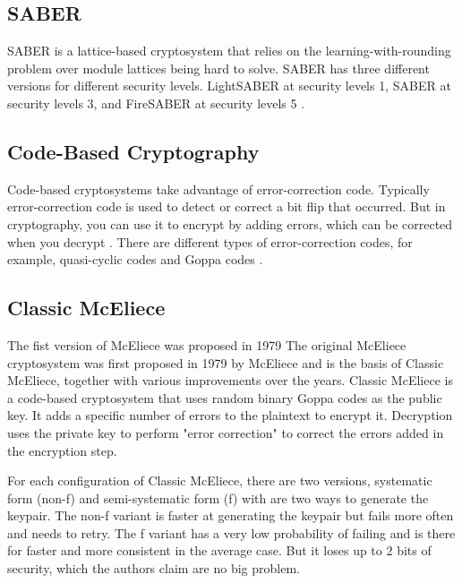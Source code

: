 
\subsection{SABER}
SABER is a lattice-based cryptosystem that relies on the learning-with-rounding problem over module lattices being hard to solve. SABER has three different versions for different security levels. LightSABER at security levels 1, SABER at security levels 3, and FireSABER at security levels 5 \cite{saber}.


\subsection{Code-Based Cryptography}
Code-based cryptosystems take advantage of error-correction code. Typically error-correction code is used to detect or correct a bit flip that occurred. But in cryptography, you can use it to encrypt by adding errors, which can be corrected when you decrypt \cite{bernstein2017}. There are different types of error-correction codes, for example, quasi-cyclic codes and Goppa codes  \cite{sendrier2011}.

\subsection{Classic McEliece}
\label{section:background:mceliece}
The fist version of McEliece was proposed in 1979 
The original McEliece cryptosystem was first proposed in 1979 by McEliece \cite{mceliece1978} and is the basis of Classic McEliece, together with various improvements over the years. Classic McEliece is a code-based cryptosystem that uses random binary Goppa codes as the public key. It adds a specific number of errors to the plaintext to encrypt it. Decryption uses the private key to perform "error correction" to correct the errors added in the encryption step.
 
For each configuration of Classic McEliece, there are two versions, systematic form (non-f) and semi-systematic form (f) with are two ways to generate the keypair. The non-f variant is faster at generating the keypair but fails more often and needs to retry. The f variant has a very low probability of failing and is there for faster and more consistent in the average case. But it loses up to 2 bits of security, which the authors claim are no big problem.

